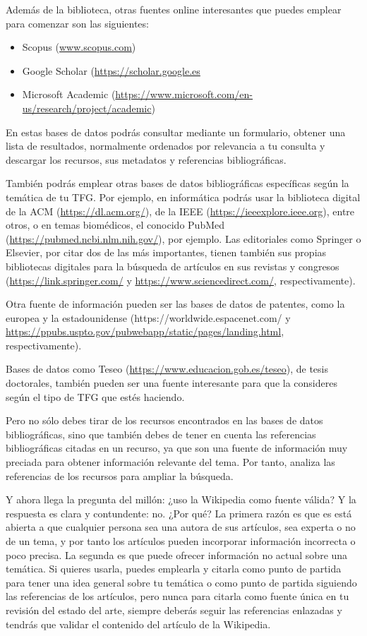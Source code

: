 Además de la biblioteca, otras fuentes online interesantes que puedes emplear para comenzar son las siguientes:

\begin{itemize}
    \item Scopus (\url{www.scopus.com})
    \item Google Scholar (\url{https://scholar.google.es}
    \item Microsoft Academic (\url{https://www.microsoft.com/en-us/research/project/academic})
\end{itemize}

En estas bases de datos podrás consultar mediante un formulario, obtener una lista de resultados, normalmente ordenados por relevancia a tu consulta y descargar los recursos, sus metadatos y referencias bibliográficas.

También podrás emplear otras bases de datos bibliográficas específicas según la temática de tu TFG. Por ejemplo, en informática podrás usar la biblioteca digital de la ACM (\url{https://dl.acm.org/}), de la IEEE (\url{https://ieeexplore.ieee.org}), entre otros, o en temas biomédicos, el conocido PubMed (\url{https://pubmed.ncbi.nlm.nih.gov/}), por ejemplo. Las editoriales como Springer o Elsevier, por citar dos de las más importantes, tienen también sus propias bibliotecas digitales para la búsqueda de artículos en sus revistas y congresos (\url{https://link.springer.com/} y \url{https://www.sciencedirect.com/}, respectivamente).

Otra fuente de información pueden ser las bases de datos de patentes, como la europea y la estadounidense (\url{}https://worldwide.espacenet.com/ y \url{https://ppubs.uspto.gov/pubwebapp/static/pages/landing.html}, respectivamente).

Bases de datos como Teseo (\url{https://www.educacion.gob.es/teseo}), de tesis doctorales, también pueden ser una fuente interesante para que la consideres según el tipo de TFG que estés haciendo.

Pero no sólo debes tirar de los recursos encontrados en las bases de datos bibliográficas, sino que también debes de tener en cuenta las referencias bibliográficas citadas en un recurso, ya que son una fuente de información muy preciada para obtener información relevante del tema. Por tanto, analiza las referencias de los recursos para ampliar la búsqueda.

Y ahora llega la pregunta del millón: ¿uso la Wikipedia como fuente válida? Y la respuesta es clara y contundente: no. ¿Por qué? La primera razón es que es está abierta a que cualquier persona sea una autora de sus artículos, sea experta o no de un tema, y por tanto los artículos pueden incorporar información incorrecta o poco precisa. La segunda es que puede ofrecer información no actual sobre una temática. Si quieres usarla, puedes emplearla y citarla como punto de partida para tener una idea general sobre tu temática o como punto de partida siguiendo las referencias de los artículos, pero nunca para citarla como fuente única en tu revisión del estado del arte, siempre deberás seguir las referencias enlazadas y tendrás que validar el contenido del artículo de la Wikipedia. %

